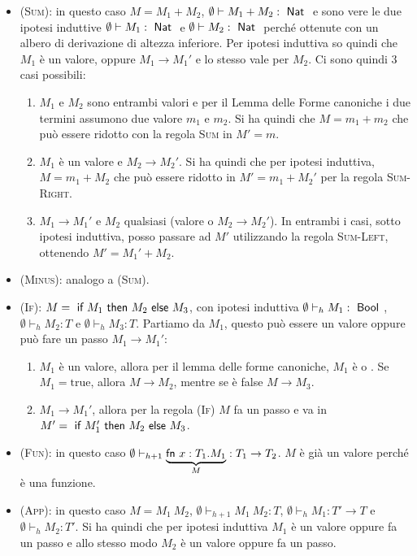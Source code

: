\begin{itemize}
	\item \textsc{(Sum)}: in questo caso $M = M_1 +M_2$, $\emptyset \vdash M_1 + M_2 : \Nat$ e sono vere le due ipotesi induttive $\emptyset \vdash M_1 : \Nat$ e $\emptyset \vdash M_2 : \Nat$ perché ottenute con un albero di derivazione di altezza inferiore.
	Per ipotesi induttiva so quindi che $M_1$ è un valore, oppure $M_1 \rightarrow M_1'$ e lo stesso vale per $M_2$.
	Ci sono quindi 3 casi possibili:
	\begin{enumerate}[a]
		\item $M_1$ e $M_2$ sono entrambi valori e per il Lemma delle Forme canoniche i due termini assumono due valore $m_1$ e $m_2$. Si ha quindi che $M = m_1 + m_2$ che può essere ridotto con la regola \textsc{Sum} in $M' = m$.
		\item $M_1$ è un valore e $M_2 \rightarrow M_2'$. Si ha quindi che per ipotesi induttiva, $M = m_1 + M_2$ che può essere ridotto in $M' = m_1 + M_2'$ per la regola \textsc{Sum-Right}.
		\item $M_1 \rightarrow M_1'$ e $M_2$ qualsiasi (valore o $M_2 \rightarrow M_2'$). In entrambi i casi, sotto ipotesi induttiva, posso passare ad $M'$ utilizzando la regola \textsc{Sum-Left}, ottenendo $M' = M_1' + M_2$. 
	\end{enumerate}
	\item \textsc{(Minus)}: analogo a \textsc{(Sum)}.
	\item \textsc{(If)}: $ M = \iif M_1 \then M_2 \eelse M_3$, con ipotesi induttiva $\emptyset \vdash_h M_1 : \Bool$, $\emptyset \vdash_h M_2 : T$ e $\emptyset \vdash_h M_3 : T$. 
	Partiamo da $M_1$, questo può essere un valore oppure può fare un passo $M_1 \rightarrow M_1'$:
	\begin{enumerate}[a]
		\item $M_1$ è un valore, allora per il lemma delle forme canoniche, $M_1$ è  o . Se $M_1 = \text{true}$, allora $M \rightarrow M_2$, mentre se è false $M \rightarrow M_3$.
		\item $M_1 \rightarrow M_1'$, allora per la regola \textsc{(If)} $M$ fa un passo e va in $M' = \iif M_1' \then M_2 \eelse M_3$.
	\end{enumerate}
	\item \textsc{(Fun)}: in questo caso $\emptyset \vdash_{h+1} \underbrace{\fn x: T_1 . M_1}_{M} : T_1 \rightarrow T_2$. $M$ è già un valore perché è una funzione.
	\item \textsc{(App)}: in questo caso $M = M_1 \: M_2$, $\emptyset \vdash_{h+1} M_1 \: M_2 : T$, $\emptyset\vdash_{h} M_1 : T'\rightarrow T $ e $\emptyset\vdash_h M_2 : T'$. Si ha quindi che per ipotesi induttiva $M_1$ è un valore oppure fa un passo e allo stesso modo $M_2$ è un valore oppure fa un passo.

\end{itemize}
